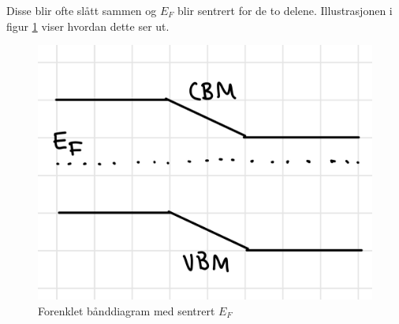 Disse blir ofte slått sammen og $E_F$ blir sentrert for de to delene. Illustrasjonen i figur \ref{fig:forenkl-sammen} viser hvordan dette ser ut.

\begin{figure}[!htb]
    \centering
    \includegraphics[scale=0.2]{Bilder/SamtaleTema6/forenklet-sentrert.jpeg}
    \caption{Forenklet bånddiagram med sentrert $E_F$}
    \label{fig:forenkl-sammen}
\end{figure}